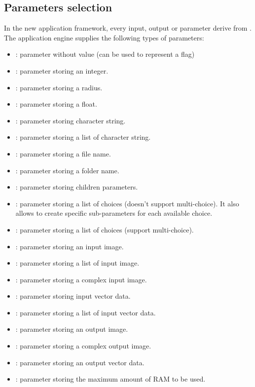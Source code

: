 \subsection{Parameters selection}
\label{sec:appParam}
In the new application framework, every input, output or parameter derive from 
. The application engine supplies the following 
types of parameters:
\begin{itemize}
  \item {} : parameter without value (can be used to represent 
  a flag)
  \item {} : parameter storing an integer.
  \item {} : parameter storing a radius.
  \item {} : parameter storing a float.
  \item {} : parameter storing character string.
  \item {} : parameter storing a list of character string.
  \item {} : parameter storing a file name.
  \item {} : parameter storing a folder name.
  \item {} : parameter storing children parameters.
  \item {} : parameter storing a list of choices (doesn't support
  multi-choice). It also allows to create specific sub-parameters for each available choice.
  \item {} : parameter storing a list of choices (support 
  multi-choice).
  \item {} : parameter storing an input image.
  \item {} : parameter storing a list of input image.
  \item {} : parameter storing a complex input image.
  \item {} : parameter storing input vector data.
  \item {} : parameter storing a list of input vector data.
  \item {} : parameter storing an output image.
  \item {} : parameter storing a complex output image.
  \item {} : parameter storing an output vector data.
  \item {} : parameter storing the maximum amount of RAM to be used.
\end{itemize}

